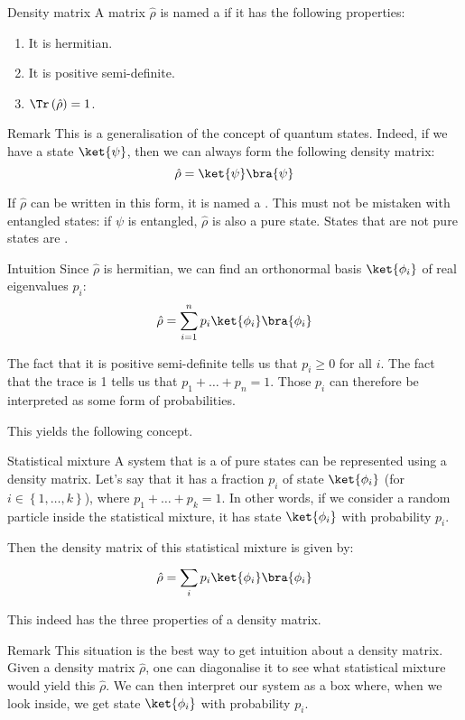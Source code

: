 \documentclass[a4paper]{article}
\begin{document}
\begin{parag}{Density matrix}
    A matrix $\hat{\rho}$ is named a  if it has the following properties:
    \begin{enumerate}
        \item It is hermitian.
        \item It is positive semi-definite.
        \item $\Tr\left(\hat{\rho}\right) = 1$.
    \end{enumerate}
    
    \begin{subparag}{Remark}
        This is a generalisation of the concept of quantum states. Indeed, if we have a state $\ket{\psi}$, then we can always form the following density matrix: 
        \[\hat{\rho} = \ket{\psi} \bra{\psi}\]

        If $\hat{\rho}$ can be written in this form, it is named a . This must not be mistaken with entangled states: if $\psi$ is entangled, $\hat{\rho}$ is also a pure state. States that are not pure states are .
    \end{subparag}

    \begin{subparag}{Intuition}
        Since $\hat{\rho}$ is hermitian, we can find an orthonormal basis $\ket{\phi_i}$ of real eigenvalues $p_i$:
        \[\hat{\rho} = \sum_{i=1}^{n} p_i \ket{\phi_i} \bra{\phi_i}\]

        The fact that it is positive semi-definite tells us that $p_i \geq 0$ for all $i$. The fact that the trace is 1 tells us that $p_1 + \ldots + p_n = 1$. Those $p_i$ can therefore be interpreted as some form of probabilities.  

        This yields the following concept.
    \end{subparag}
\end{parag}

\begin{parag}{Statistical mixture}
    A system that is a  of pure states can be represented using a density matrix. Let's say that it has a fraction $p_i$ of state $\ket{\phi_i}$ (for $i \in \left\{1, \ldots, k\right\}$), where $p_1 + \ldots + p_k = 1$. In other words, if we consider a random particle inside the statistical mixture, it has state $\ket{\phi_i}$ with probability $p_i$.

    Then the density matrix of this statistical mixture is given by: 
    \[\hat{\rho} = \sum_{i}^{} p_i \ket{\phi_i}\bra{\phi_i}\]

    This indeed has the three properties of a density matrix.

    \begin{subparag}{Remark}
        This situation is the best way to get intuition about a density matrix. Given a density matrix $\hat{\rho}$, one can diagonalise it to see what statistical mixture would yield this $\hat{\rho}$. We can then interpret our system as a box where, when we look inside, we get state $\ket{\phi_i}$ with probability $p_i$.
    \end{subparag}
\end{parag}
\end{document}
